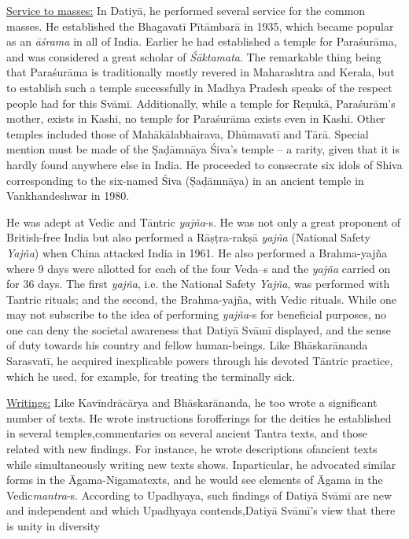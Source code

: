 \begin{enumerate}
 \underline{Service to masses:} In Datiyā, he performed several service for the common masses. He established the Bhagavatī Pītāmbarā in 1935, which became popular as an \textit{āśrama} in all of India. Earlier he had established a temple for Paraśurāma, and was considered a great scholar of \textit{Śāktamata}. The remarkable thing being that Paraśurāma is traditionally mostly revered in Maharashtra and Kerala, but to establish such a temple successfully in Madhya Pradesh speaks of the respect people had for this Svāmī. Additionally, while a temple for Reṇukā, Paraśurām’s mother, exists in Kashi, no temple for Paraśurāma exists even in Kashi. Other temples included those of Mahākālabhairava, Dhūmavatī and Tārā. Special mention must be made of the Ṣaḍāmnāya Śiva’s temple – a rarity, given that it is hardly found anywhere else in India. He proceeded to consecrate six idols of Shiva corresponding to the six-named Śiva (Ṣaḍāmnāya) in an ancient temple in Vankhandeshwar in 1980.

 He was adept at Vedic and Tāntric \textit{yajña}-s. He was not only a great proponent of British-free India but also performed a Rāṣṭra-rakṣā \textit{yajña} (National Safety \textit{Yajña}) when China attacked India in 1961. He also performed a Brahma-yajña where 9 days were allotted for each of the four Veda--s and the \textit{yajña} carried on for 36 days. The first \textit{yajña}, i.e. the National Safety \textit{Yajña}, was performed with Tantric rituals; and the second, the Brahma-yajña, with Vedic rituals. While one may not subscribe to the idea of performing \textit{yajña}-s for beneficial purposes, no one can deny the societal awareness that Datiyā Svāmī displayed, and the sense of duty towards his country and fellow human-beings. Like Bhāskarānanda Sarasvatī, he acquired inexplicable powers through his devoted Tāntric practice, which he used, for example, for treating the terminally sick.

 \underline{Writings:} Like Kavīndrācārya and Bhāskarānanda, he too wrote a significant number of texts. He wrote instructions for\break offerings for the deities he established in several temples,\break commentaries on several ancient Tantra texts, and those related with new findings. For instance, he wrote descriptions of\break ancient texts while simultaneously writing new texts shows. In\break particular, he advocated similar forms in the Āgama-Nigama\break texts, and he would see elements of Āgama in the Vedic\break \textit{mantra}-s. According to Upadhyaya, such findings of Datiyā Svāmī are new and independent and which Upadhyaya contends,\break Datiyā Svāmī’s view that there is unity in diversity


\end{enumerate}
